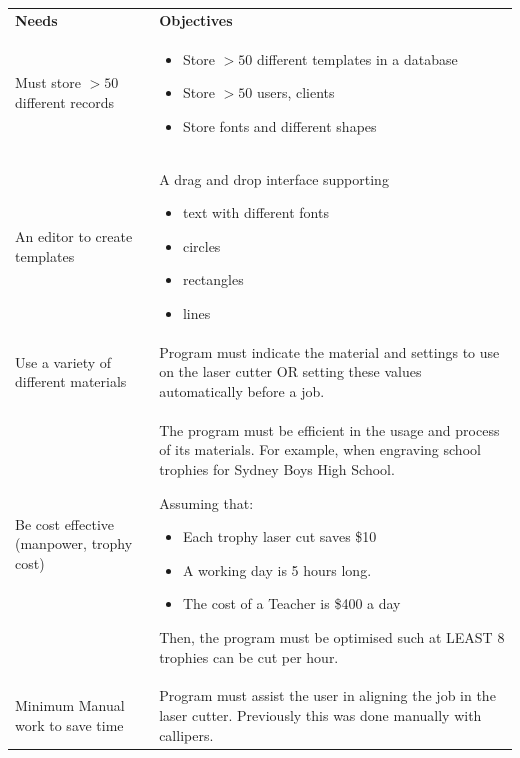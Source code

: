 \documentclass[oneside,openany,11pt,a4paper]{report}
\begin{document}
\begin{longtable}{|p{4cm}|p{10cm}|}
	
   \hline
   \rowcolor{gray!50}
   \textbf{Needs} & \textbf{Objectives} \\
   
   Must store $>50$ different records & 
	\begin{itemize}
		\itemsep0em
   	\item Store $>50$ different templates in a database
	\item Store $>50$ users, clients 
	\item Store fonts and different shapes 
	
	\end{itemize} \\ \hline
	
	An editor to create templates & A drag and drop interface supporting
	\begin{itemize}
		\itemsep0em
		\item text with different fonts
		\item circles
		\item rectangles
		\item lines
	\end{itemize} \\ \hline

	
	Use a variety of different materials & Program must indicate the material and settings to use on the laser cutter OR setting these values automatically before a job. \\ \hline
	
	Be cost effective (manpower, trophy cost) & The program must be efficient in the usage and process of its materials. For example, when engraving school trophies for Sydney Boys High School.\newline

	Assuming that: 
	\begin{itemize}
		\itemsep0em
		\item Each trophy laser cut saves \$10
		\item A working day is 5 hours long.
		\item The cost of a Teacher is \$400 a day
	\end{itemize} 
	Then, the program must be optimised such at LEAST 8 trophies can be cut per hour.\\ \hline
	
	
  Minimum Manual work to save time &  Program must assist the user in aligning the job in the laser cutter. Previously this was done manually with callipers. \\ \hline
  

\end{longtable}
\end{document}
